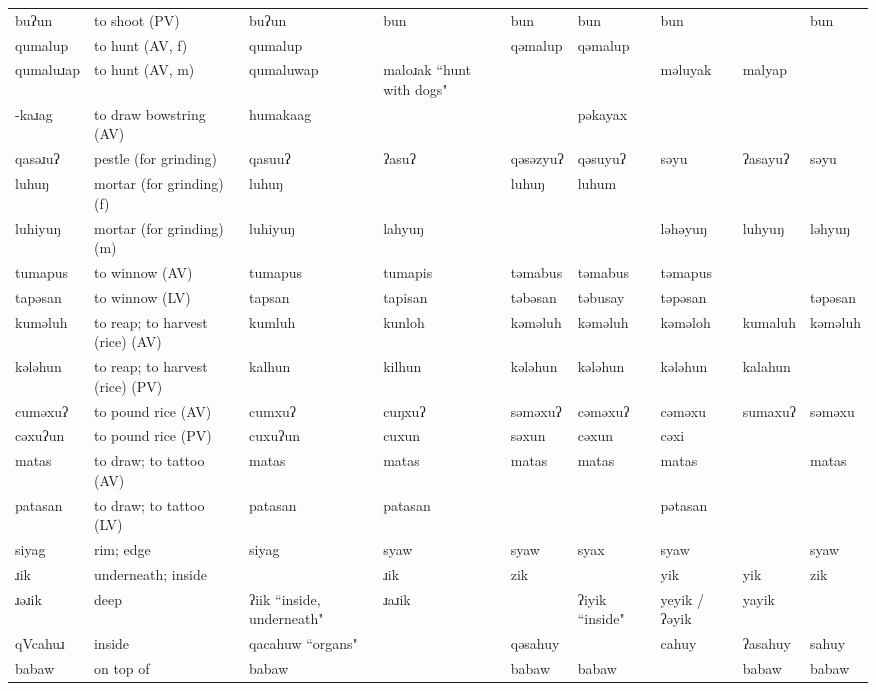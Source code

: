 \begin{landscape}
\begin{longtable}{*{9}{>{\raggedright\arraybackslash}p{}}}
\text{*}buʔun & to shoot (PV) & buʔun & bun & bun & bun & bun &  & bun\\
\text{*}qumalup & to hunt (AV, f) & qumalup &  & qəmalup & qəmalup &  &  & \\
\text{*}qumaluɹap & to hunt (AV, m) & qumaluwap & maloɹak ``hunt with dogs" &  &  & məluyak & malyap & \\
\text{*}-kaɹag & to draw bowstring (AV) & humakaag &  &  & pəkayax &  &  & \\
\text{*}qasəɹuʔ & pestle (for grinding) & qasuuʔ & ʔasuʔ & qəsəzyuʔ & qəsuyuʔ & səyu & ʔasayuʔ & səyu\\
\text{*}luhuŋ & mortar (for grinding) (f) & luhuŋ &  & luhuŋ & luhum &  &  & \\
\text{*}luhiyuŋ & mortar (for grinding) (m) & luhiyuŋ & lahyuŋ &  &  & ləhəyuŋ & luhyuŋ & ləhyuŋ\\
\text{*}tumapus & to winnow (AV) & tumapus & tumapis & təmabus & təmabus & təmapus &  & \\
\text{*}tapəsan & to winnow (LV) & tapsan & tapisan & təbəsan & təbusay & təpəsan &  & təpəsan\\
\text{*}kuməluh & to reap; to harvest (rice) (AV) & kumluh & kunloh & kəməluh & kəməluh & kəməloh & kumaluh & kəməluh\\
\text{*}kələhun & to reap; to harvest (rice) (PV) & kalhun & kilhun & kələhun & kələhun & kələhun & kalahun & \\
\text{*}cuməxuʔ & to pound rice (AV) & cumxuʔ & cuŋxuʔ & səməxuʔ & cəməxuʔ & cəməxu & sumaxuʔ & səməxu\\
\text{*}cəxuʔun & to pound rice (PV) & cuxuʔun & cuxun & səxun & cəxun & cəxi &  & \\
\text{*}matas & to draw; to tattoo (AV) & matas & matas & matas & matas & matas &  & matas\\
\text{*}patasan & to draw; to tattoo (LV) & patasan & patasan &  &  & pətasan &  & \\
\text{*}siyag & rim; edge & siyag & syaw & syaw & syax & syaw &  & syaw\\
\text{*}ɹik & underneath; inside &  & ɹik & zik &  & yik & yik & zik\\
\text{*}ɹəɹik & deep & ʔiik ``inside, underneath" & ɹaɹik &  & ʔiyik ``inside" & yeyik / ʔəyik & yayik & \\
\text{*}qVcahuɹ & inside & qacahuw ``organs" &  & qəsahuy &  & cahuy & ʔasahuy & sahuy\\
\text{*}babaw & on top of & babaw &  & babaw & babaw &  & babaw & babaw\\

\end{longtable}
\end{landscape}
